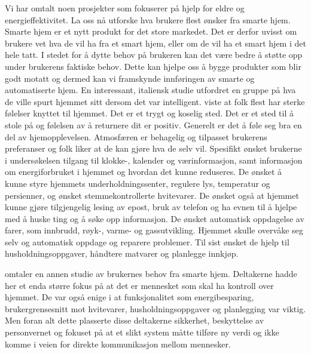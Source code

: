 Vi har omtalt noen prosjekter som fokuserer på hjelp for eldre og energieffektivitet. La oss nå utforske hva brukere flest ønsker fra smarte hjem. Smarte hjem er et nytt produkt for det store markedet. Det er derfor uvisst om brukere vet hva de vil ha fra et smart hjem, eller om de vil ha et smart hjem i det hele tatt. I stedet for å dytte behov på brukeren kan det være bedre å støtte opp under brukerens faktiske behov. Dette kan hjelpe oss å bygge produkter som blir godt motatt og dermed kan vi framskynde innføringen av smarte og automatiserte hjem. En interessant, italiensk studie utfordret en gruppe på hva de ville spurt hjemmet sitt dersom det var intelligent. \citet{bonino11} viste at folk flest har sterke følelser knyttet til hjemmet. Det er et trygt og koselig sted. Det er et sted til å stole på og følelsen av å returnere dit er positiv. Generelt er det å føle seg bra en del av hjemopplevelsen. Atmosfæren er behagelig og tilpasset brukerens preferanser og folk liker at de kan gjøre hva de selv vil. Spesifikt ønsket brukerne i undersøkelsen tilgang til klokke-, kalender og værinformasjon, samt informasjon om energiforbruket i hjemmet og hvordan det kunne reduseres. De ønsket å kunne styre hjemmets underholdningssenter, regulere lys, temperatur og persienner, og ønsket stemmekontrollerte hvitevarer. De ønsket også at hjemmet kunne gjøre tilgjengelig lesing av epost, bruk av telefon og ha evnen til å hjelpe med å huske ting og å søke opp informasjon. De ønsket automatisk oppdagelse av farer, som innbrudd, røyk-, varme- og gassutvikling. Hjemmet skulle overvåke seg selv og automatisk oppdage og reparere problemer. Til sist ønsket de hjelp til husholdningsoppgaver, håndtere matvarer og planlegge innkjøp.

\citet{userreq} omtaler en annen studie av brukernes behov fra smarte hjem. Deltakerne hadde her et enda større fokus på at det er mennesket som skal ha kontroll over hjemmet. De var også enige i at funksjonalitet som energibesparing, brukergrensesnitt mot hvitevarer, husholdningsoppgaver og planlegging var viktig. Men foran alt dette plasserte disse deltakerne sikkerhet, beskyttelse av personvernet og fokuset på at et slikt system måtte tilføre ny verdi og ikke komme i veien for direkte kommunikasjon mellom mennesker. 

